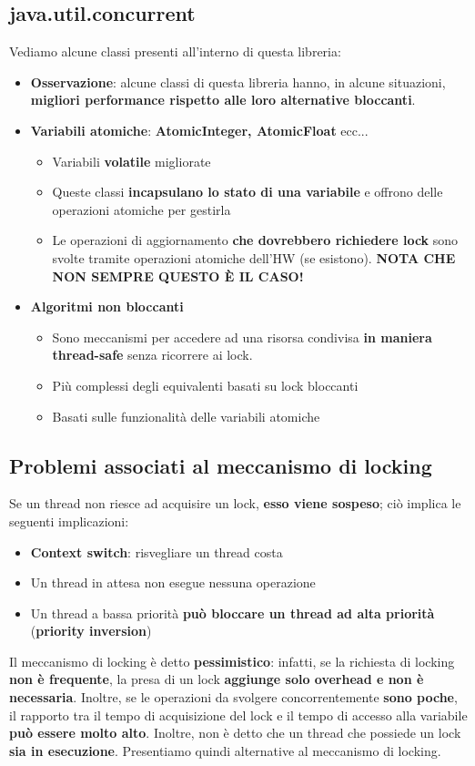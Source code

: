 \documentclass[12pt]{article}
\begin{document}
\subsection{java.util.concurrent}
Vediamo alcune classi presenti all'interno di questa libreria:
\begin{itemize}
    \item \textbf{Osservazione}: alcune classi di questa libreria hanno, in alcune situazioni, \textbf{migliori performance rispetto alle loro alternative bloccanti}.
    \item \textbf{Variabili atomiche}: \textbf{AtomicInteger, AtomicFloat} ecc...
          \begin{itemize}
              \item Variabili \textbf{volatile} migliorate
              \item Queste classi \textbf{incapsulano lo stato di una variabile} e offrono delle operazioni atomiche per gestirla
              \item Le operazioni di aggiornamento \textbf{che dovrebbero richiedere lock} sono svolte tramite operazioni atomiche dell'HW (se esistono). \textbf{NOTA CHE NON SEMPRE QUESTO È IL CASO!}
          \end{itemize}
    \item \textbf{Algoritmi non bloccanti}
          \begin{itemize}
              \item Sono meccanismi per accedere ad una risorsa condivisa \textbf{in maniera thread-safe} senza ricorrere ai lock.
              \item Più complessi degli equivalenti basati su lock bloccanti
              \item Basati sulle funzionalità delle variabili atomiche
          \end{itemize}
\end{itemize}

\subsection{Problemi associati al meccanismo di locking}
Se un thread non riesce ad acquisire un lock, \textbf{esso viene sospeso}; ciò implica le seguenti implicazioni:
\begin{itemize}
    \item \textbf{Context switch}: risvegliare un thread costa
    \item Un thread in attesa non esegue nessuna operazione
    \item Un thread a bassa priorità \textbf{può bloccare un thread ad alta priorità} (\textbf{priority inversion})
\end{itemize}
Il meccanismo di locking è detto \textbf{pessimistico}: infatti, se la richiesta di locking \textbf{non è frequente}, la presa di un lock \textbf{aggiunge solo overhead e non è necessaria}. Inoltre, se le operazioni da svolgere concorrentemente \textbf{sono poche}, il rapporto tra il tempo di acquisizione del lock e il tempo di accesso alla variabile \textbf{può essere molto alto}. Inoltre, non è detto che un thread che possiede un lock \textbf{sia in esecuzione}.
Presentiamo quindi alternative al meccanismo di locking.
\end{document}

